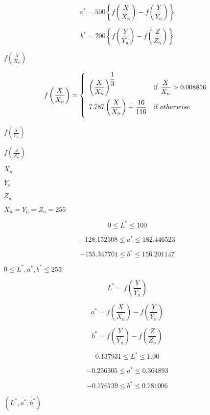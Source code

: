 \documentclass{article}
\begin{document}
\[ a^*=500\left\{f\left(\frac{X}{X_{n}}\right) - f\left(\frac{Y}{Y_{n}}\right)\right\} \]
\pagebreak

\[ b^*=200\left\{f\left(\frac{Y}{Y_{n}}\right) - f\left(\frac{Z}{Z_{n}}\right)\right\} \]
\pagebreak

$f\left(\frac{X}{X_{n}}\right)$
\pagebreak

\[ f\left(\frac{X}{X_{n}}\right)=\left \{ \begin{array}{ll} \left(\dfrac{X}{X_{n}}\right)^{\dfrac{1}{3}} & \mbox{if}\ \dfrac{X}{X_{n}} > 0.008856 \vspace{.5em} \\ 7.787\left(\dfrac{X}{X_{n}}\right) + \dfrac{16}{116} & \mbox{if}\ otherwise \vspace{.5em} \\ \end{array} \right. \]
\pagebreak

$f\left(\frac{Y}{Y_{n}}\right)$
\pagebreak

$f\left(\frac{Z}{Z_{n}}\right)$
\pagebreak

$X_{n}$
\pagebreak

$Y_{n}$
\pagebreak

$Z_{n}$
\pagebreak

$X_{n}=Y_{n}=Z_{n}=255$
\pagebreak

\[ 0 \le L^* \le 100 \]
\pagebreak

\[ -128.152308 \le a^* \le 182.446523 \]
\pagebreak

\[ -155.347701 \le b^* \le 156.201147 \]
\pagebreak

$ 0 \le L^{*},a^{*},b^{*} \le 255 $
\pagebreak

\[ L^{*}=f\left(\frac{Y}{Y_{n}}\right) \]
\pagebreak

\[ a^{*}=f\left(\frac{X}{X_{n}}\right) - f\left(\frac{Y}{Y_{n}}\right) \]
\pagebreak

\[ b^{*}=f\left(\frac{Y}{Y_{n}}\right) - f\left(\frac{Z}{Z_{n}}\right) \]
\pagebreak

\[ 0.137931 \le L^{*} \le 1.00 \]
\pagebreak

\[ -0.256305 \le a^{*} \le 0.364893 \]
\pagebreak

\[ -0.776739 \le b^{*} \le 0.781006 \]
\pagebreak

$\left(\acute{L^{*}},\acute{a^{*}},\acute{b^{*}}\right) $
\pagebreak
\end{document}
